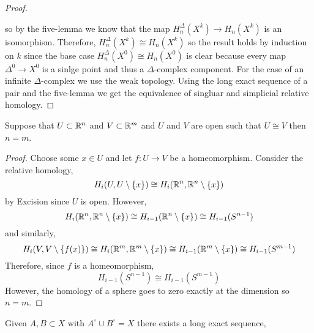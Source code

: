 \documentclass[12pt]{extarticle}
\begin{document}
\begin{proof}
\begin{center}
\end{center}
so by the five-lemma we know that the map $H_n^\Delta(X^k) \to H_n(X^k)$ is an isomorphism. Therefore, $H_n^\Delta(X^k) \cong H_n(X^k)$ so the result holds by induction on $k$ since the base case $H_n^\Delta(X^0) \cong H_n(X^0)$ is clear because every map $\Delta^0 \to X^0$ is a sinlge point and thus a $\Delta$-complex component. For the case of an infinite $\Delta$-complex we use the weak topology. Using the long exact sequence of a pair and the five-lemma we get the equivalence of singluar and simplicial relative homology. 
\end{proof}

\begin{theorem}
Suppose that $U \subset \mathbb{R}^n$ and $V \subset \mathbb{R}^m$ and $U$ and $V$ are open such that $U \cong V$ then $n = m$.
\end{theorem}

\begin{proof}
Choose some $x \in U$ and let $f : U \to V$ be a homeomorphism. Consider the relative homology,
\[ H_i(U, U \setminus \{ x \}) \cong H_i(\mathbb{R}^n, \mathbb{R}^n \setminus \{x\}) \]
by Excision since $U$ is open. However,
\[ H_i(\mathbb{R}^n, \mathbb{R}^n \setminus \{x\}) \cong H_{i-1}(\mathbb{R}^n \setminus \{x\}) \cong H_{i-1}(S^{n-1}) \]
and similarly,  
\[H_i(V, V \setminus \{ f(x) \}) \cong H_i(\mathbb{R}^m, \mathbb{R}^m \setminus \{x\}) \cong H_{i-1}(\mathbb{R}^m \setminus \{x\}) \cong H_{i-1}(S^{m-1}) \]
Therefore, since $f$ is a homeomorphism,
\[ H_{i-1}(S^{n-1}) \cong H_{i-1}(S^{m-1}) \]
However, the homology of a sphere goes to zero exactly at the dimension so $n = m$.
\end{proof}

\begin{theorem}
Given $A, B \subset X$ with $A^\circ \cup B^\circ = X$ there exists a long exact sequence,
\begin{center}
\end{center}
\end{theorem}
\end{document}

